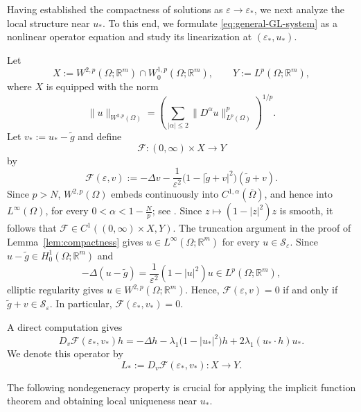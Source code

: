 \documentclass[11pt]{amsart}
\theoremstyle{definition}
\theoremstyle{plain}
\newcommand{\abs}[1]{\lvert#1\rvert}
\newcommand{\norm}[1]{\lVert#1\rVert}
\newcommand{\R}{\mathbb{R}}
\numberwithin{equation}{section}
\begin{document}
Having established the compactness of solutions as
$\varepsilon\to\varepsilon_*$, we next analyze the local structure near
$u_*$. To this end, we formulate \eqref{eq:general-GL-system} as a
nonlinear operator equation and study its linearization at
$(\varepsilon_*,u_*)$.

Let
\[
X:=W^{2,p}(\Omega;\R^m)\cap W_0^{1,p}(\Omega;\R^m),
\qquad
Y:=L^p(\Omega;\R^m),
\]
where $X$ is equipped with the norm
\[
\norm{u}_{W^{2,p}(\Omega)}
=
\left(
\sum_{\abs{\alpha}\leq2}
\norm{D^\alpha u}_{L^p(\Omega)}^p
\right)^{1/p}.
\]
Let
$v_*:=u_*-\widetilde g$ and define
\[
\mathcal{F}\colon(0,\infty)\times X\to Y
\]
by
\[
\mathcal{F}(\varepsilon,v)
:=
-\Delta v
-\frac{1}{\varepsilon^2}
\bigl(1-\abs{\widetilde g+v}^2\bigr)
(\widetilde g+v).
\]
Since $p>N$, $W^{2,p}(\Omega)$ embeds continuously into
$C^{1,\alpha}(\overline{\Omega})$, and hence into $L^\infty(\Omega)$,
for every $0<\alpha<1-\frac{N}{p}$; see
\cite[Theorem~7.26(ii)]{GilbargTrudinger2001}. 
Since
$z\mapsto(1-\abs{z}^2)z$ is smooth, it follows that
$\mathcal{F}\in C^1((0,\infty)\times X,Y)$. The truncation argument in
the proof of Lemma~\ref{lem:compactness} gives
$u\in L^\infty(\Omega;\R^m)$ for every
$u\in\mathcal{S}_\varepsilon$. Since
$u-\widetilde g\in H_0^1(\Omega;\R^m)$ and
\[
-\Delta(u-\widetilde g)
=
\frac{1}{\varepsilon^2}(1-\abs{u}^2)u
\in L^p(\Omega;\R^m),
\]
elliptic regularity gives
$u\in W^{2,p}(\Omega;\R^m)$. Hence,
$\mathcal{F}(\varepsilon,v)=0$ if and only if
$\widetilde g+v\in\mathcal{S}_\varepsilon$. In particular,
$\mathcal{F}(\varepsilon_*,v_*)=0$.



A direct computation gives
\[
D_v\mathcal{F}(\varepsilon_*,v_*)h
=
-\Delta h
-\lambda_1\bigl(1-\abs{u_*}^2\bigr)h
+
2\lambda_1(u_*\cdot h)u_*.
\]
We denote this operator by
\[
L_*:=D_v\mathcal{F}(\varepsilon_*,v_*)\colon X\to Y.
\]

The following nondegeneracy property is crucial for applying the implicit function theorem and obtaining local uniqueness near $u_*$.
\end{document}
